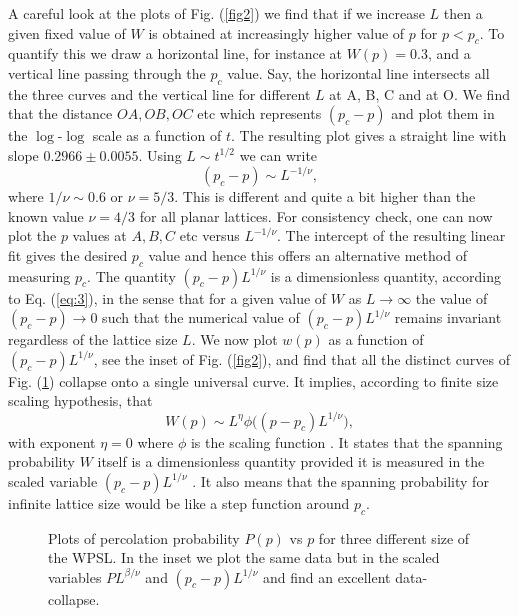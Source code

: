 \documentclass[twocolumn,showpacs,preprintnumbers,amsmath,amssymb]{article}
\begin{document}
A careful look at the plots of Fig. (\ref{fig2}) we find that if we increase $L$ then a given fixed value of $W$ is obtained at increasingly higher value of $p$ for $p<p_c$. 
To quantify this 
we draw a horizontal line, for instance at $W(p)=0.3$, and a vertical line passing through the $p_c$ value. Say, the
horizontal line intersects all the three curves and the vertical line for different $L$ at A, B, C and at O. 
We find that the distance $OA, OB, OC$ etc which represents $(p_c-p)$ and plot them in the $\log$-$\log$ scale as a function
of $t$. The resulting plot gives a straight line with slope $0.2966\pm 0.0055$. Using $L\sim t^{1/2}$ we can write
\begin{equation}
\label{eq:3}
(p_c-p) \sim L^{-1/\nu},
\end{equation}
where $1/\nu \sim 0.6$ or $\nu=5/3$. This is different and quite a bit higher than the known value $\nu=4/3$ for all planar lattices. For consistency check, one can now
plot the $p$ values at $A, B, C$ etc versus $L^{-1/\nu}$. The intercept of the resulting linear fit gives the desired $p_c$ value 
and hence this offers an alternative method of measuring $p_c$. The quantity 
$(p_c-p)L^{1/\nu}$ is a dimensionless quantity, according to Eq. (\ref{eq:3}), in the sense that for a given value of $W$ as $L\rightarrow \infty$ the value of $(p_c-p)\rightarrow 0$ 
such that the numerical value of $(p_c-p)L^{1/\nu}$ remains invariant regardless of the lattice
size $L$. We now plot $w(p)$ as a function of $(p_c-p)L^{1/\nu}$, see the inset of Fig. (\ref{fig2}), and find that all the distinct curves of
Fig. (\ref{fig3}) collapse onto a single universal curve. It implies, according to finite size scaling hypothesis, that
\begin{equation}
W(p)\sim L^\eta \phi\Big( (p-p_c)L^{1/\nu}\Big ), 
\end{equation}
with exponent $\eta=0$ where $\phi$ is the scaling function \cite{ref.saberi}. It states that the spanning probability $W$ itself is a dimensionless quantity provided it is measured in the scaled variable  
$(p_c-p)L^{1/\nu}$ \cite{ref.barenblatt}. 
It also means that the spanning probability for infinite lattice size would be
like a step function around $p_c$. 


\begin{figure}
\label{fig3}
\caption{Plots of percolation probability $P(p)$ vs $p$ for three different size of the WPSL. In the
inset we plot the same data but in the scaled variables $PL^{\beta/\nu}$ and $(p_c-p)L^{1/\nu}$ and  find an excellent data-collapse.
\label{fig3}
}
\end{figure}
\end{document}
